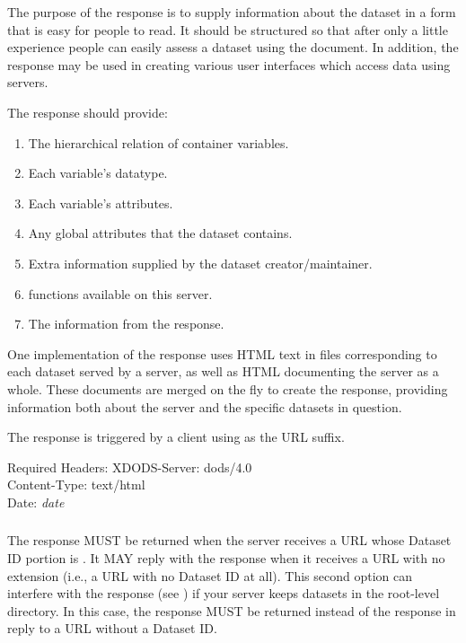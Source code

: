 \documentclass[justify]{dods-paper}
\begin{document}
The purpose of the \INFO response is to supply information about the
dataset in a form that is easy for people to read. It should be
structured so that after only a little experience people can easily
assess a dataset using the document. In addition, the \INFO response
may be used in creating various user interfaces which access data
using \DAP servers.

The \INFO response should provide:

\begin{enumerate}
\item The hierarchical relation of container variables.
\item Each variable's datatype.
\item Each variable's attributes.
\item Any global attributes that the dataset contains.
\item Extra information supplied by the dataset creator/maintainer.
\item \CE functions available on this server.
\item The information from the \VER response.
\end{enumerate}

One implementation of the \INFO response uses HTML text in files
corresponding to each dataset served by a server, as well as HTML
documenting the server as a whole.  These documents are merged on the
fly to create the \INFO response, providing information both about the
server and the specific datasets in question.  

The \INFO response is triggered by a client using  as the
URL suffix.

\begin{textoutput}{Required Headers:}
XDODS-Server: dods/4.0\\
Content-Type: text/html\\
Date: \emph{date}
\end{textoutput}


\subsubsection{\HELP}
\label{sec-help}

The \HELP response MUST be returned when the server receives a URL
whose Dataset ID portion is .  It MAY reply with the \HELP
response when it receives a URL with no extension (i.e., a URL with no
Dataset ID at all).  This second option can interfere with the \DIR
response (see ) if your server keeps datasets in
the root-level directory.  In this case, the \DIR response MUST be
returned instead of the \HELP response in reply to a URL without a
Dataset ID.
\end{document}
